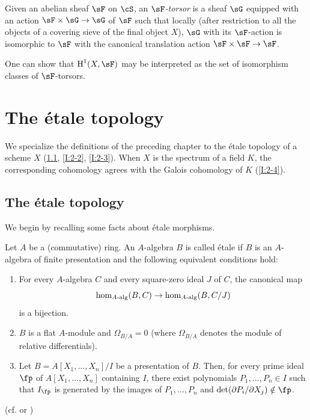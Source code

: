\subsubsection{}\label{I:1-6-6}

Given an abelian sheaf $\sF$ on $\cS$, an \emph{$\sF$-torsor} is a
sheaf $\sG$ equipped with an action $\sF\times\sG\to\sG$ of $\sF$
such that locally (after restriction to all the objects of a covering
sieve of the final object $X$), $\sG$ with its $\sF$-action is
isomorphic to $\sF$ with the canonical translation action
$\sF\times\sF\to\sF$.

One can show that $\h^1(X,\sF)$ may be interpreted as the set of
isomorphism classes of $\sF$-torsors.

\section{The étale topology}\label{I:2}

We specialize the definitions of the preceding chapter to the étale
topology of a scheme $X$ (\ref{I:2-1}, \ref{I:2-2}, \ref{I:2-3}). When
$X$ is the spectrum of a field $K$, the corresponding cohomology agrees
with the Galois cohomology of $K$ (\ref{I:2-4}).

\subsection{The étale topology}\label{I:2-1}

We begin by recalling some facts about étale morphisms.

\begin{definition}\label{I:2-1-1}
Let $A$ be a (commutative) ring. An $A$-algebra $B$ is called étale if
$B$ is an $A$-algebra of finite presentation and the following equivalent
conditions hold:
\begin{enumerate}[\indent a)]
  \item For every $A$-algebra $C$ and every square-zero ideal $J$ of $C$,
    the canonical map
    \[
      \hom_{A\textnormal{-alg}}(B,C) \to \hom_{A\textnormal{-alg}}(B,C/J)
    \]
    is a bijection.
  \item $B$ is a flat $A$-module and $\Omega_{B/A}=0$ (where
    $\Omega_{B/A}$ denotes the module of relative differentials).
  \item Let $B=A[X_1,\dotsc,X_n]/I$ be a presentation of $B$. Then, for
    every prime ideal $\fp$ of $A[X_1,\dotsc,X_n]$ containing $I$, there
    exist polynomials $P_1,\dotsc,P_n\in I$ such that $I_\fp$ is generated
    by the images of $P_1,\dotsc,P_n$ and
    $\det(\partial P_i/\partial X_j)\notin\fp$.
\end{enumerate}
\end{definition}
(cf. \cite[I]{sga1} or \cite[V]{ra70})

